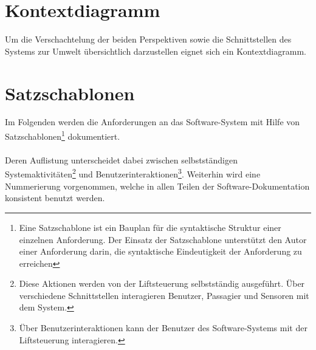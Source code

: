 \newpage
\section{Kontextdiagramm}
Um die Verschachtelung der beiden Perspektiven sowie die Schnittstellen des Systems zur Umwelt übersichtlich darzustellen eignet sich ein Kontextdiagramm.

\newpage
\section{Satzschablonen}
Im Folgenden werden die Anforderungen an das Software-System mit Hilfe von Satzschablonen\footnote{Eine Satzschablone ist ein Bauplan für die syntaktische Struktur einer einzelnen Anforderung. Der Einsatz der Satzschablone unterstützt den Autor einer Anforderung darin, die syntaktische Eindeutigkeit der Anforderung zu erreichen} dokumentiert.

\paragraph{}
Deren Auflistung unterscheidet dabei zwischen selbstständigen Systemaktivitäten\footnote{Diese Aktionen werden von der Liftsteuerung selbstständig ausgeführt. Über verschiedene Schnittstellen interagieren Benutzer, Passagier und Sensoren mit dem System.} und Benutzerinteraktionen\footnote{Über Benutzerinteraktionen kann der Benutzer des Software-Systems mit der Liftsteuerung interagieren.}. Weiterhin wird eine Nummerierung vorgenommen, welche in allen Teilen der Software-Dokumentation konsistent benutzt werden.


